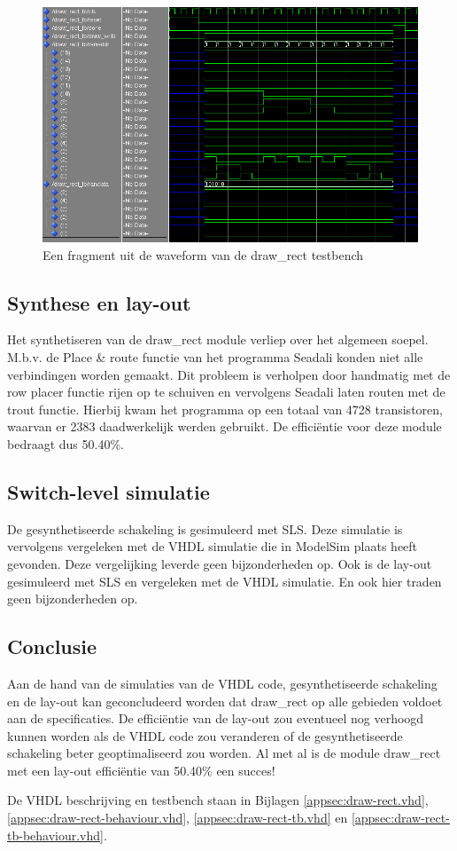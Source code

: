 \documentclass{scrartcl} %
\begin{document}
\begin{figure}[H]
	\centering
	\includegraphics[width=\textwidth]{resources/draw_rect-vhdlsim.png}
	\caption{Een fragment uit de waveform van de draw\_rect testbench}
	\label{fig:draw_rect-vhdlsim}
\end{figure}

\subsection{Synthese en lay-out}
Het synthetiseren van de draw\_rect module verliep over het algemeen soepel. M.b.v. de Place \& route functie van het programma Seadali konden niet alle verbindingen worden gemaakt. Dit probleem is verholpen door handmatig met de row placer functie rijen op te schuiven en vervolgens Seadali laten routen met de trout functie. Hierbij kwam het programma op een totaal van 4728 transistoren, waarvan er 2383 daadwerkelijk werden gebruikt. De efficiëntie voor deze module bedraagt dus 50.40\%.

\subsection{Switch-level simulatie}
De gesynthetiseerde schakeling is gesimuleerd met SLS. Deze simulatie is vervolgens vergeleken met de VHDL simulatie die in ModelSim plaats heeft gevonden. Deze vergelijking leverde geen bijzonderheden op. Ook is de lay-out gesimuleerd met SLS en vergeleken met de VHDL simulatie. En ook hier traden geen bijzonderheden op.

\subsection{Conclusie}
Aan de hand van de simulaties van de VHDL code, gesynthetiseerde schakeling en de lay-out kan geconcludeerd worden dat draw\_rect op alle gebieden voldoet aan de specificaties. De efficiëntie van de lay-out zou eventueel nog verhoogd kunnen worden als de VHDL code zou veranderen of de gesynthetiseerde schakeling beter geoptimaliseerd zou worden. Al met al is de module draw\_rect met een lay-out efficiëntie van 50.40\% een succes!

De VHDL beschrijving en testbench staan in Bijlagen \ref{appsec:draw-rect.vhd}, \ref{appsec:draw-rect-behaviour.vhd}, \ref{appsec:draw-rect-tb.vhd} en \ref{appsec:draw-rect-tb-behaviour.vhd}.
\end{document}
